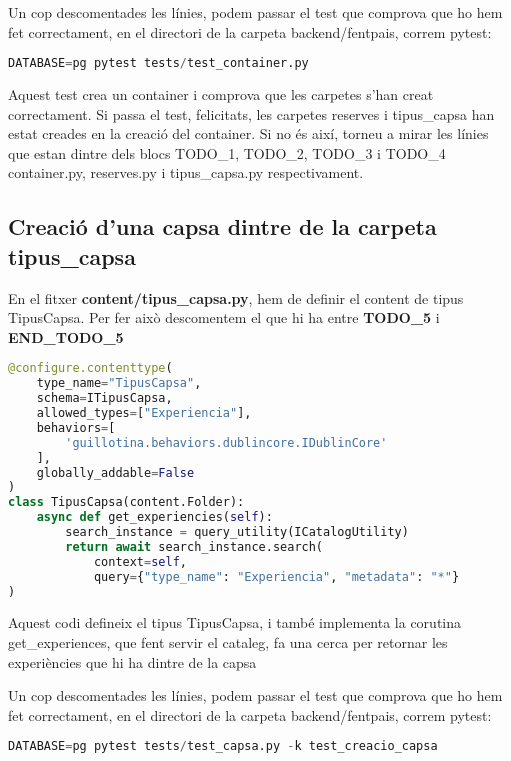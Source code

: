 \documentclass[a4paper, 11pt]{article}
\begin{document}
  Un cop descomentades les línies, podem passar el test que comprova
  que ho hem fet correctament, en el directori de la carpeta
  backend/fentpais, correm pytest:
  \begin{lstlisting}[language=Python, caption=Testing 1]
    DATABASE=pg pytest tests/test_container.py
  \end{lstlisting}
  
  Aquest test crea un container i comprova que les carpetes s'han
  creat correctament. Si passa el test, felicitats, les carpetes
  reserves i tipus\_capsa han estat creades en la creació del
  container. Si no és així, torneu a mirar les línies que estan dintre
  dels blocs TODO\_1, TODO\_2, TODO\_3 i TODO\_4 container.py,
  reserves.py i tipus\_capsa.py respectivament.

\subsection{Creació d'una capsa dintre de la carpeta tipus\_capsa}
En el fitxer \textbf{content/tipus\_capsa.py}, hem de definir el content de tipus
  TipusCapsa. Per fer això descomentem el que hi ha entre
  \textbf{TODO\_5} i \textbf{END\_TODO\_5}

\begin{lstlisting}[language=Python, caption=Definició content type TipusCapsa]
@configure.contenttype(
    type_name="TipusCapsa",
    schema=ITipusCapsa,
    allowed_types=["Experiencia"],
    behaviors=[
        'guillotina.behaviors.dublincore.IDublinCore'
    ],
    globally_addable=False
)
class TipusCapsa(content.Folder):
    async def get_experiencies(self):
        search_instance = query_utility(ICatalogUtility)
        return await search_instance.search(
            context=self,
            query={"type_name": "Experiencia", "metadata": "*"}
)
\end{lstlisting}

Aquest codi defineix el tipus TipusCapsa, i també implementa la
corutina get\_experiences, que fent servir el cataleg, fa una cerca per
retornar les experiències que hi ha dintre de la capsa

Un cop descomentades les línies, podem passar el test que comprova
  que ho hem fet correctament, en el directori de la carpeta
  backend/fentpais, correm pytest:
  \begin{lstlisting}[language=Python, caption=Testing 2]
    DATABASE=pg pytest tests/test_capsa.py -k test_creacio_capsa
  \end{lstlisting}
\end{document}
